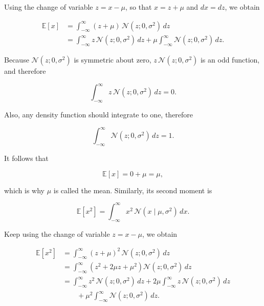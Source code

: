 \documentclass[10pt,twocolumn]{memoir}
\begin{document}
Using the change of variable $z=x-\mu$, so that $x=z+\mu$ and $dx=dz$, we obtain

\begin{equation}
\begin{aligned}
    \mathbb{E}[x] &= \int_{-\infty}^{\infty} (z+\mu)\,\mathcal{N}(z;0,\sigma^2)\,dz \\
    &=
    \int_{-\infty}^{\infty} z\,\mathcal{N}(z;0,\sigma^2)\,dz + \mu \int_{-\infty}^{\infty}\mathcal{N}(z;0,\sigma^2)\,dz.
\end{aligned}
\end{equation}

Because $\mathcal{N}(z;0,\sigma^2)$ is symmetric about zero, $z\,\mathcal{N}(z;0,\sigma^2)$ is an odd function, and therefore

\begin{equation}
    \int_{-\infty}^{\infty} z\,\mathcal{N}(z;0,\sigma^2)\,dz = 0.
\end{equation}

Also, any density function should integrate to one, therefore

\begin{equation}
    \int_{-\infty}^{\infty}\mathcal{N}(z;0,\sigma^2)\,dz = 1.
\end{equation}

It follows that

\begin{equation}
    \mathbb{E}[x] = 0 + \mu = \mu,
\end{equation}

which is why $\mu$ is called the mean. Similarly, its second moment is

\begin{equation}
    \mathbb{E}[x^2] = \int_{-\infty}^{\infty} x^2\,\mathcal{N}(x\mid\mu,\sigma^2)\,dx.
\end{equation}

Keep using the change of variable $z=x-\mu$, we obtain

\begin{equation}
\begin{aligned}
    \mathbb{E}[x^2]
    &=
    \int_{-\infty}^{\infty}(z+\mu)^2\,\mathcal{N}(z;0,\sigma^2)\,dz \\
    &=
    \int_{-\infty}^{\infty}\left(z^2+2\mu z+\mu^2\right)\mathcal{N}(z;0,\sigma^2)\,dz \\
    &=
    \int_{-\infty}^{\infty}z^2\,\mathcal{N}(z;0,\sigma^2)\,dz
    + 2\mu \int_{-\infty}^{\infty}z\,\mathcal{N}(z;0,\sigma^2)\,dz \\
    &\qquad
    + \mu^2 \int_{-\infty}^{\infty}\mathcal{N}(z;0,\sigma^2)\,dz.
\end{aligned}
\end{equation}
\end{document}
